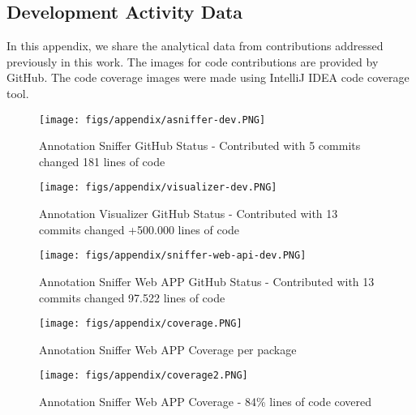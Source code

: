 
\begin{apendicesenv}

\partapendices

\chapter{Development Activity Data}\label{cap:appendixA}

In this appendix, we share the analytical data from contributions addressed previously in this work. The images for code contributions are provided by GitHub. The code coverage images were made using IntelliJ IDEA code coverage tool.

\begin{figure}[ht]
  \texttt{[image: figs/appendix/asniffer-dev.PNG]}
  \caption{Annotation Sniffer GitHub Status - Contributed with 5 commits changed 181 lines of code}
  \label{fig:annotation_sniffer_dev}
\end{figure}

\begin{figure}[ht]
  \texttt{[image: figs/appendix/visualizer-dev.PNG]}
  \caption{Annotation Visualizer GitHub Status - Contributed with 13 commits changed +500.000 lines of code}
  \label{fig:annotation_visualizer_dev}
\end{figure}

\begin{figure}[ht]
  \texttt{[image: figs/appendix/sniffer-web-api-dev.PNG]}
  \caption{Annotation Sniffer Web APP GitHub Status - Contributed with 13 commits changed 97.522 lines of code}
  \label{fig:annotation_webapp_dev}
\end{figure}

\begin{figure}[ht]
  \texttt{[image: figs/appendix/coverage.PNG]}
  \caption{Annotation Sniffer Web APP Coverage per package}
  \label{fig:annotation_webapp_coverage}
\end{figure}

\begin{figure}[ht]
  \texttt{[image: figs/appendix/coverage2.PNG]}
  \caption{Annotation Sniffer Web APP Coverage - 84\% lines of code covered}
  \label{fig:annotation_webapp_coverage2}
\end{figure}


\end{apendicesenv}
